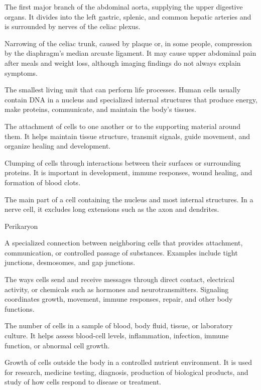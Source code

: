  The first major branch of the abdominal aorta, supplying the upper digestive organs. It divides into the left gastric, splenic, and common hepatic arteries and is surrounded by nerves of the celiac plexus.

 Narrowing of the celiac trunk, caused by plaque or, in some people, compression by the diaphragm's median arcuate ligament. It may cause upper abdominal pain after meals and weight loss, although imaging findings do not always explain symptoms.

 The smallest living unit that can perform life processes. Human cells usually contain DNA in a nucleus and specialized internal structures that produce energy, make proteins, communicate, and maintain the body's tissues.

 The attachment of cells to one another or to the supporting material around them. It helps maintain tissue structure, transmit signals, guide movement, and organize healing and development.

 Clumping of cells through interactions between their surfaces or surrounding proteins. It is important in development, immune responses, wound healing, and formation of blood clots.

 The main part of a cell containing the nucleus and most internal structures. In a nerve cell, it excludes long extensions such as the axon and dendrites.

\synonyms
Perikaryon

 A specialized connection between neighboring cells that provides attachment, communication, or controlled passage of substances. Examples include tight junctions, desmosomes, and gap junctions.

 The ways cells send and receive messages through direct contact, electrical activity, or chemicals such as hormones and neurotransmitters. Signaling coordinates growth, movement, immune responses, repair, and other body functions.

 The number of cells in a sample of blood, body fluid, tissue, or laboratory culture. It helps assess blood-cell levels, inflammation, infection, immune function, or abnormal cell growth.

 Growth of cells outside the body in a controlled nutrient environment. It is used for research, medicine testing, diagnosis, production of biological products, and study of how cells respond to disease or treatment.

